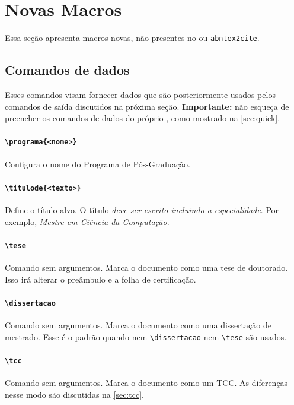 \documentclass[embeddedlogo]{ufsc-thesis-rn46-2019}
\newcommand{\lacmd}[1]{\texttt{\textbackslash{}#1}}
\begin{document}
\section{Novas Macros}

Essa seção apresenta macros novas, não presentes no \abnTeX{} ou
\texttt{abntex2cite}.

\subsection{Comandos de dados}
\label{sec:dados}

Esses comandos visam fornecer dados que são posteriormente usados pelos
comandos de saída discutidos na próxima seção. \textbf{Importante:} não esqueça
de preencher os comandos de dados do próprio \abnTeX, como mostrado na
\autoref{sec:quick}.

\paragraph*{\lacmd{programa\{<nome>\}}} Configura o nome do Programa de
Pós-Graduação.

\paragraph*{\lacmd{titulode\{<texto>\}}} Define o título alvo.  O título
\textit{deve ser escrito incluindo a especialidade}. Por exemplo, \emph{Mestre
  em Ciência da Computação}.

\paragraph*{\lacmd{tese}} Comando sem argumentos. Marca o documento como uma
tese de doutorado. Isso irá alterar o preâmbulo e a folha de certificação.

\paragraph*{\lacmd{dissertacao}} Comando sem argumentos. Marca o documento como
uma dissertação de mestrado. Esse é o padrão quando nem \lacmd{dissertacao} nem
\lacmd{tese} são usados.

\paragraph*{\lacmd{tcc}} Comando sem argumentos. Marca o documento como um
TCC. As diferenças nesse modo são discutidas na \autoref{sec:tcc}.
\end{document}

